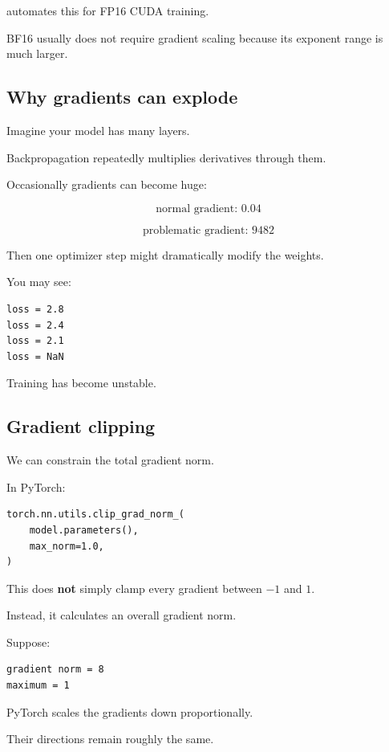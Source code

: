 automates this for FP16 CUDA training.

BF16 usually does not require gradient scaling because its exponent range is much larger.

\subsection{Why gradients can explode}

Imagine your model has many layers.

Backpropagation repeatedly multiplies derivatives through them.

Occasionally gradients can become huge:

\[
  \text{normal gradient: } 0.04
\]

\[
  \text{problematic gradient: } 9482
\]

Then one optimizer step might dramatically modify the weights.

You may see:

\begin{lstlisting}[style=shadedpython,language={}]
loss = 2.8
loss = 2.4
loss = 2.1
loss = NaN
\end{lstlisting}

Training has become unstable.

\subsection{Gradient clipping}

We can constrain the total gradient norm.

In PyTorch:

\begin{lstlisting}[style=shadedpython]
torch.nn.utils.clip_grad_norm_(
    model.parameters(),
    max_norm=1.0,
)
\end{lstlisting}

This does \textbf{not} simply clamp every gradient between $-1$ and $1$.

Instead, it calculates an overall gradient norm.

Suppose:

\begin{lstlisting}[style=shadedpython,language={}]
gradient norm = 8
maximum = 1
\end{lstlisting}

PyTorch scales the gradients down proportionally.

Their directions remain roughly the same.

